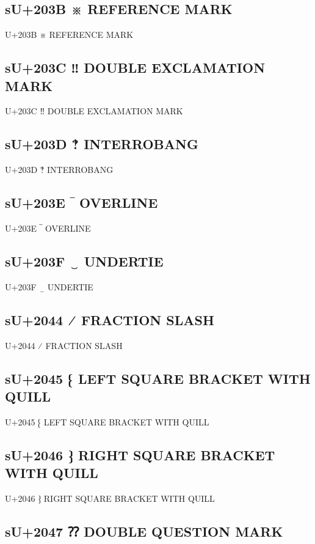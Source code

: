 \subsection{sU+203B ※  REFERENCE MARK}

U+203B ※  REFERENCE MARK

\subsection{sU+203C ‼ DOUBLE EXCLAMATION MARK}

U+203C ‼ DOUBLE EXCLAMATION MARK

\subsection{sU+203D ‽  INTERROBANG}

U+203D ‽  INTERROBANG

\subsection{sU+203E ‾ OVERLINE}

U+203E ‾ OVERLINE

\subsection{sU+203F ‿ UNDERTIE}

U+203F ‿ UNDERTIE

\subsection{sU+2044 ⁄  FRACTION SLASH}

U+2044 ⁄  FRACTION SLASH

\subsection{sU+2045 ⁅ LEFT SQUARE BRACKET WITH QUILL}

U+2045 ⁅ LEFT SQUARE BRACKET WITH QUILL

\subsection{sU+2046 ⁆ RIGHT SQUARE BRACKET WITH QUILL}

U+2046 ⁆ RIGHT SQUARE BRACKET WITH QUILL

\subsection{sU+2047 ⁇ DOUBLE QUESTION MARK}

